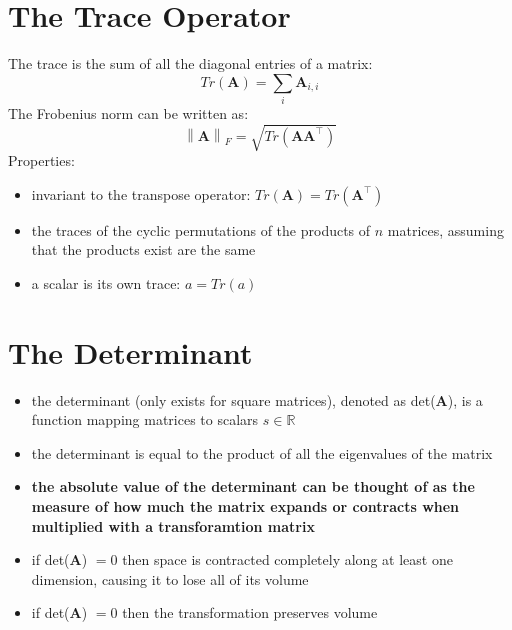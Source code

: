 \documentclass[11pt,twocolumn]{report}
\def\realnumbers{\mathbb{R}}
\newcommand{\norm}[1]{\left\lVert#1\right\rVert}
\begin{document}
\section{The Trace Operator}
The trace is the sum of all the diagonal entries of a matrix:
\begin{equation}
  Tr(\bm{A}) = \sum_i \bm{A}_{i, i}
\end{equation}
The Frobenius norm can be written as:
\begin{equation}
  \norm{\bm{A}}_F = \sqrt{Tr(\bm{AA}^\intercal)}
\end{equation}
Properties:
\begin{itemize}
  \item invariant to the transpose operator: $Tr(\bm{A}) = Tr(\bm{A}^\intercal)$
  \item the traces of the cyclic permutations of the products of $n$ matrices,
    assuming that the products exist are the same
  \item a scalar is its own trace: $a = Tr(a)$
\end{itemize}

\section{The Determinant}
\begin{itemize}
  \item the determinant (only exists for square matrices), denoted as
    det($\bm{A}$), is a function mapping matrices to scalars $s \in
    \realnumbers$
  \item the determinant is equal to the product of all the eigenvalues of the
    matrix
  \item \textbf{the absolute value of the determinant can be thought of as the
      measure of how much the matrix expands or contracts when multiplied with a
    transforamtion matrix}
  \item if det($\bm{A}$) $= 0$ then space is contracted completely along at
    least one dimension, causing it to lose all of its volume
  \item if det($\bm{A}$) $= 0$ then the transformation preserves volume
\end{itemize}
\end{document}

